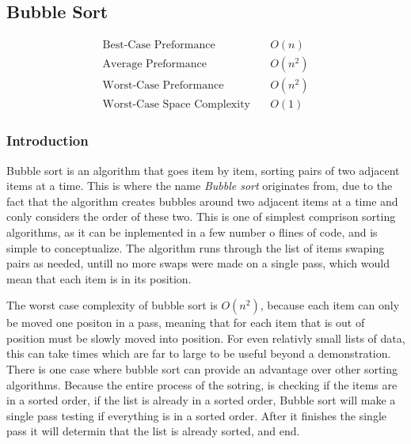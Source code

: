 \documentclass{subfile}
\begin{document}
   \subsection{Bubble Sort}\label{sub:bubble_sort}
   
   \begin{align*}
     \text{Best-Case Preformance}\quad &O\left(n\right)\\
     \text{Average Preformance}\quad &O\left(n^2\right)\\
     \text{Worst-Case Preformance}\quad &O\left(n^2\right)\\
     \text{Worst-Case Space Complexity}\quad &O\left(1\right)
   \end{align*}

   \begin{multicols}{2}
     \subsubsection{Introduction}\label{ssub:introduction}
     
     Bubble sort is an algorithm that goes item by item, sorting pairs of two
     adjacent items at a time. This is where the name \textit{Bubble sort}
     originates from, due to the fact that the algorithm creates bubbles around
     two adjacent items at a time and conly considers the order of these two.
     This is one of simplest comprison sorting algorithms, as it can be
     inplemented in a few number o flines of code, and is simple to
     conceptualize. The algorithm runs through the list of items swaping pairs
     as needed, untill no more swaps were made on a single pass, which would
     mean that each item is in its position.

     The worst case complexity of bubble sort is $O(n^2)$, because each item
     can only be moved one positon in a pass, meaning that for each item
     that is out of position must be slowly moved into position. For even
     relativly small lists of data, this can take times which are far to large
     to be useful beyond a demonstration. There is one case where bubble sort
     can provide an advantage over other sorting algorithms. Because the entire
     process of the sotring, is checking if the items are in a sorted order,
     if the list is already in a sorted order, Bubble sort will make a single
     pass testing if everything is in a sorted order. After it finishes the
     single pass it will determin that the list is already sorted, and end.


\end{multicols}
\end{document}
